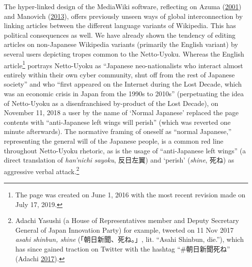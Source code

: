 \documentclass[10pt,british,A4paper,twoside]{memoir}
\begin{document}
The hyper-linked design of the MediaWiki software, reflecting on Azuma
(\protect\hyperlink{ref-azuma_otaku:_2001}{2001}) and Manovich
(\protect\hyperlink{ref-manovich_software_2013}{2013}), offers
previously unseen ways of global interconnection by linking articles
between the different language variants of Wikipedia. This has political
consequences as well. We have already shown the tendency of editing
articles on non-Japanese Wikipedia variants (primarily the English
variant) by several users depicting tropes common to the Netto-Uyoku.
Whereas the English article\footnote{The page was created on June 1, 2016
  with the most recent revision made on July 17, 2019.} portrays
Netto-Uyoku as ``Japanese neo-nationalists who interact almost entirely
within their own cyber community, shut off from the rest of Japanese
society'' and who ``first appeared on the Internet during the Lost
Decade, which was an economic crisis in Japan from the 1990s to 2010s''
(perpetuating the idea of Netto-Uyoku as a disenfranchised by-product of
the Lost Decade), on November 11, 2018 a user by the name of `Normal
Japanese' replaced the page contents with ``anti-Japanese left wings
will perish'' (which was reverted one minute afterwards). The normative
framing of oneself as ``normal Japanese,'' representing the general will
of the Japanese people, is a common red line throughout Netto-Uyoku
rhetoric, as is the usage of ``anti-Japanese left wings'' (a direct
translation of \emph{han'nichi sayoku}, 反日左翼) and `perish'
(\emph{shine}, 死ね) as aggressive verbal attack.\footnote{Adachi
  Yasushi (a House of Representatives member and Deputy Secretary
  General of Japan Innovation Party) for example, tweeted on 11 Nov 2017
  \emph{asahi shinbun, shine} (「朝日新聞、死ね。」, lit. ``Asahi
  Shinbun, die.''), which has since gained traction on Twitter with the
  hashtag ``\#朝日新聞死ね'' (Adachi
  \protect\hyperlink{ref-adachi_eng._2017}{2017}).}
\end{document}
